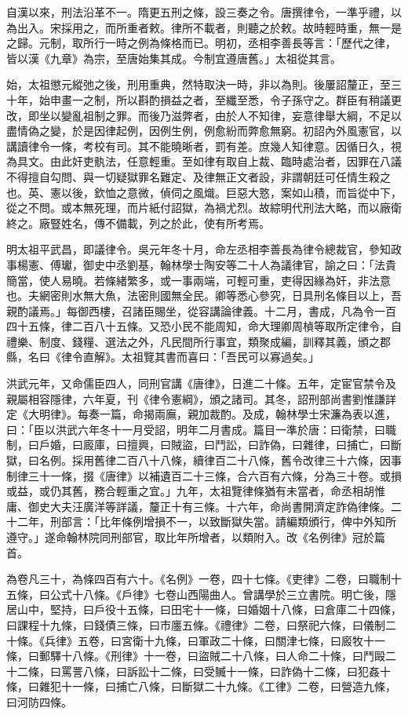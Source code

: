 

自漢以來，刑法沿革不一。隋更五刑之條，設三奏之令。唐撰律令，一準乎禮，以為出入。宋採用之，而所重者敕。律所不載者，則聽之於敕。故時輕時重，無一是之歸。元制，取所行一時之例為條格而已。明初，丞相李善長等言：「歷代之律，皆以漢《九章》為宗，至唐始集其成。今制宜遵唐舊。」太祖從其言。

始，太祖懲元縱弛之後，刑用重典，然特取決一時，非以為則。後屢詔釐正，至三十年，始申畫一之制，所以斟酌損益之者，至纖至悉，令子孫守之。群臣有稍議更改，即坐以變亂祖制之罪。而後乃滋弊者，由於人不知律，妄意律舉大綱，不足以盡情偽之變，於是因律起例，因例生例，例愈紛而弊愈無窮。初詔內外風憲官，以講讀律令一條，考校有司。其不能曉晰者，罰有差。庶幾人知律意。因循日久，視為具文。由此奸吏骫法，任意輕重。至如律有取自上裁、臨時處治者，因罪在八議不得擅自勾問、與一切疑獄罪名難定、及律無正文者設，非謂朝廷可任情生殺之也。英、憲以後，欽恤之意微，偵伺之風熾。巨惡大憝，案如山積，而旨從中下，從之不問。或本無死理，而片紙付詔獄，為禍尤烈。故綜明代刑法大略，而以廠衛終之。廠豎姓名，傳不備載，列之於此，使有所考焉。

明太祖平武昌，即議律令。吳元年冬十月，命左丞相李善長為律令總裁官，參知政事楊憲、傅瓛，御史中丞劉基，翰林學士陶安等二十人為議律官，諭之曰：「法貴簡當，使人易曉。若條緒繁多，或一事兩端，可輕可重，吏得因緣為奸，非法意也。夫網密則水無大魚，法密則國無全民。卿等悉心參究，日具刑名條目以上，吾親酌議焉。」每御西樓，召諸臣賜坐，從容講論律義。十二月，書成，凡為令一百四十五條，律二百八十五條。又恐小民不能周知，命大理卿周楨等取所定律令，自禮樂、制度、錢糧、選法之外，凡民間所行事宜，類聚成編，訓釋其義，頒之郡縣，名曰《律令直解》。太祖覽其書而喜曰：「吾民可以寡過矣。」

洪武元年，又命儒臣四人，同刑官講《唐律》，日進二十條。五年，定宦官禁令及親屬相容隱律，六年夏，刊《律令憲綱》，頒之諸司。其冬，詔刑部尚書劉惟謙詳定《大明律》。每奏一篇，命揭兩廡，親加裁酌。及成，翰林學士宋濂為表以進，曰：「臣以洪武六年冬十一月受詔，明年二月書成。篇目一準於唐：曰衛禁，曰職制，曰戶婚，曰廄庫，曰擅興，曰賊盜，曰鬥訟，曰詐偽，曰雜律，曰捕亡，曰斷獄，曰名例。採用舊律二百八十八條，續律百二十八條，舊令改律三十六條，因事制律三十一條，掇《唐律》以補遺百二十三條，合六百有六條，分為三十卷。或損或益，或仍其舊，務合輕重之宜。」九年，太祖覽律條猶有未當者，命丞相胡惟庸、御史大夫汪廣洋等詳議，釐正十有三條。十六年，命尚書開濟定詐偽律條。二十二年，刑部言：「比年條例增損不一，以致斷獄失當。請編類頒行，俾中外知所遵守。」遂命翰林院同刑部官，取比年所增者，以類附入。改《名例律》冠於篇首。

為卷凡三十，為條四百有六十。《名例》一卷，四十七條。《吏律》二卷，曰職制十五條，曰公式十八條。《戶律》七卷山西陽曲人。曾講學於三立書院。明亡後，隱居山中，堅持，曰戶役十五條，曰田宅十一條，曰婚姻十八條，曰倉庫二十四條，曰課程十九條，曰錢債三條，曰市廛五條。《禮律》二卷，曰祭祀六條，曰儀制二十條。《兵律》五卷，曰宮衛十九條，曰軍政二十條，曰關津七條，曰廄牧十一條，曰郵驛十八條。《刑律》十一卷，曰盜賊二十八條，曰人命二十條，曰鬥毆二十二條，曰罵詈八條，曰訴訟十二條，曰受贓十一條，曰詐偽十二條，曰犯姦十條，曰雜犯十一條，曰捕亡八條，曰斷獄二十九條。《工律》二卷，曰營造九條，曰河防四條。

